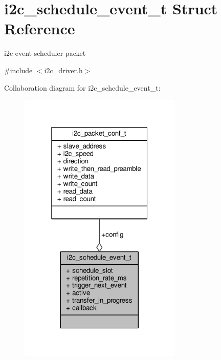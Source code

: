\hypertarget{structi2c__schedule__event__t}{\section{i2c\+\_\+schedule\+\_\+event\+\_\+t Struct Reference}
\label{structi2c__schedule__event__t}
}


i2c event scheduler packet  




{\ttfamily \#include $<$i2c\+\_\+driver.\+h$>$}



Collaboration diagram for i2c\+\_\+schedule\+\_\+event\+\_\+t\+:
\nopagebreak
\begin{figure}[H]
\begin{center}
\leavevmode
\includegraphics[width=220pt]{structi2c__schedule__event__t__coll__graph}
\end{center}
\end{figure}
